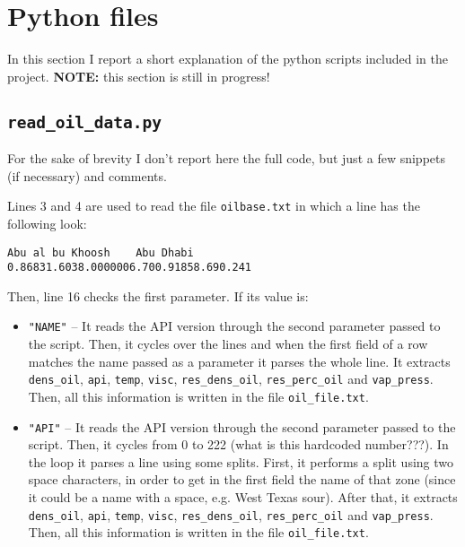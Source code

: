 \section{Python files}

In this section I report a short explanation of the python scripts included in the project. \textbf{NOTE:} this section is still in progress!

\subsection{\texttt{read\_oil\_data.py}}

For the sake of brevity I don't report here the full code, but just a few snippets (if necessary) and comments.

Lines 3 and 4 are used to read the file \texttt{oilbase.txt} in which a line has the following look:

\begin{lstlisting}
Abu al bu Khoosh    Abu Dhabi       0.86831.6038.0000006.700.91858.690.241
\end{lstlisting}

Then, line 16 checks the first parameter. If its value is:

\begin{itemize}
    \item \texttt{"NAME"} -- It reads the API version through the second parameter passed to the script. Then, it cycles over the lines and when the first field of a row matches the name passed as a parameter it parses the whole line. It extracts \texttt{dens\_oil}, \texttt{api}, \texttt{temp}, \texttt{visc}, \texttt{res\_dens\_oil}, \texttt{res\_perc\_oil} and \texttt{vap\_press}. Then, all this information is written in the file \texttt{oil\_file.txt}.
    
    \item \texttt{"API"} -- It reads the API version through the second parameter passed to the script. Then, it cycles from 0 to 222 (what is this hardcoded number???). In the loop it parses a line using some splits. First, it performs a split using two space characters, in order to get in the first field the name of that zone (since it could be a name with a space, e.g. West Texas sour). After that, it extracts \texttt{dens\_oil}, \texttt{api}, \texttt{temp}, \texttt{visc}, \texttt{res\_dens\_oil}, \texttt{res\_perc\_oil} and \texttt{vap\_press}. Then, all this information is written in the file \texttt{oil\_file.txt}.
    
\end{itemize}

